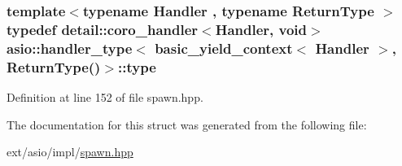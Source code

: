 \subsubsection[{type}]{\setlength{\rightskip}{0pt plus 5cm}template$<$typename Handler , typename Return\+Type $>$ typedef {\bf detail\+::coro\+\_\+handler}$<$Handler, void$>$ {\bf asio\+::handler\+\_\+type}$<$ {\bf basic\+\_\+yield\+\_\+context}$<$ Handler $>$, Return\+Type()$>$\+::{\bf type}}\label{structasio_1_1handler__type_3_01basic__yield__context_3_01_handler_01_4_00_01_return_type_07_08_4_a95cc39df11262f252961b7f1a4e1586a}


Definition at line 152 of file spawn.\+hpp.



The documentation for this struct was generated from the following file\+:\begin{DoxyCompactItemize}
\item 
ext/asio/impl/\hyperlink{impl_2spawn_8hpp}{spawn.\+hpp}\end{DoxyCompactItemize}
